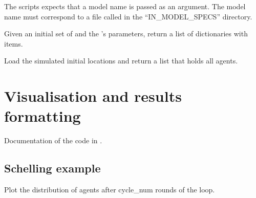 \documentclass[a4paper,11pt,english]{sphinxmanual}
\begin{document}
The scripts expects that a model name is passed as an
argument. The model name must correspond to a file called
 in the “IN\_MODEL\_SPECS” directory.

\begin{fulllineitems}
\label{\detokenize{analysis:src.analysis.schelling.run_analysis}}
Given an initial set of  and the ’s parameters,
return a list of dictionaries with  items.

\end{fulllineitems}


\begin{fulllineitems}
\label{\detokenize{analysis:src.analysis.schelling.setup_agents}}
Load the simulated initial locations and return a list
that holds all agents.

\end{fulllineitems}



\chapter{Visualisation and results formatting}
\label{\detokenize{final:visualisation-and-results-formatting}}\label{\detokenize{final:final}}\label{\detokenize{final::doc}}
Documentation of the code in .


\section{Schelling example}
\label{\detokenize{final:module-src.final.plot_locations}}\label{\detokenize{final:schelling-example}}

\begin{fulllineitems}
\label{\detokenize{final:src.final.plot_locations.plot_locations}}
Plot the distribution of agents after cycle\_num rounds of the loop.

\end{fulllineitems}
\end{document}
